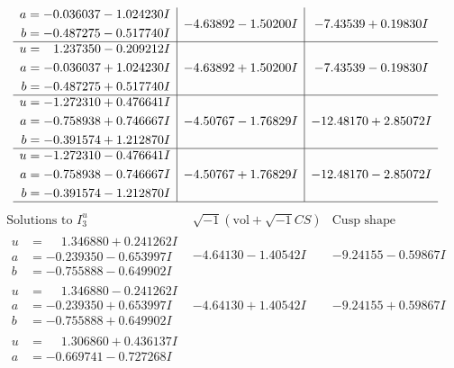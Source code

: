 \documentclass[1p]{elsarticle_modified}
\theoremstyle{definition}
\newcommand{\I}{\sqrt{-1}}
\begin{document}
$$\begin{array}{c|c|c}
\begin{aligned}
a &= -0.036037 - 1.024230 I \\
b &= -0.487275 - 0.517740 I\end{aligned}
 & -4.63892 - 1.50200 I & -7.43539 + 0.19830 I \\ \hline\begin{aligned}
u &= \phantom{-}1.237350 - 0.209212 I \\
a &= -0.036037 + 1.024230 I \\
b &= -0.487275 + 0.517740 I\end{aligned}
 & -4.63892 + 1.50200 I & -7.43539 - 0.19830 I \\ \hline\begin{aligned}
u &= -1.272310 + 0.476641 I \\
a &= -0.758938 + 0.746667 I \\
b &= -0.391574 + 1.212870 I\end{aligned}
 & -4.50767 - 1.76829 I & -12.48170 + 2.85072 I \\ \hline\begin{aligned}
u &= -1.272310 - 0.476641 I \\
a &= -0.758938 - 0.746667 I \\
b &= -0.391574 - 1.212870 I\end{aligned}
 & -4.50767 + 1.76829 I & -12.48170 - 2.85072 I\\
 \hline 
 \end{array}$$\newpage$$\begin{array}{c|c|c}  
\text{Solutions to }I^u_{3}& \I (\text{vol} + \sqrt{-1}CS) & \text{Cusp shape}\\
 \hline 
\begin{aligned}
u &= \phantom{-}1.346880 + 0.241262 I \\
a &= -0.239350 - 0.653997 I \\
b &= -0.755888 - 0.649902 I\end{aligned}
 & -4.64130 - 1.40542 I & -9.24155 - 0.59867 I \\ \hline\begin{aligned}
u &= \phantom{-}1.346880 - 0.241262 I \\
a &= -0.239350 + 0.653997 I \\
b &= -0.755888 + 0.649902 I\end{aligned}
 & -4.64130 + 1.40542 I & -9.24155 + 0.59867 I \\ \hline\begin{aligned}
u &= \phantom{-}1.306860 + 0.436137 I \\
a &= -0.669741 - 0.727268 I \\

\end{aligned}
\end{array}$$
\end{document}
